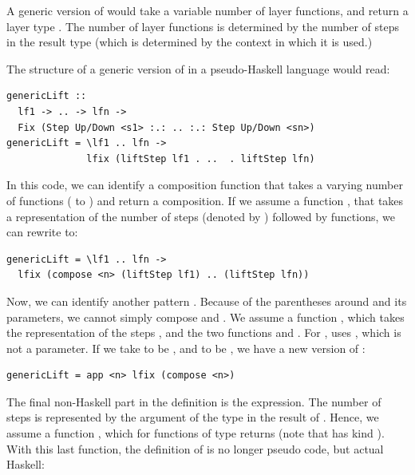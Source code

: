 \documentclass[preprint,natbib]{sigplanconf}
\begin{document}

A generic version of  would take a variable number of layer functions, and return a layer type . The number of layer functions is determined by the number of steps in the result type (which is determined by the context in which it is used.)

The structure of a generic version of  in a pseudo-Haskell language would read:

\begin{small}
\begin{verbatim}
genericLift :: 
  lf1 -> .. -> lfn ->
  Fix (Step Up/Down <s1> :.: .. :.: Step Up/Down <sn>)
genericLift = \lf1 .. lfn -> 
              lfix (liftStep lf1 . ..  . liftStep lfn)
\end{verbatim}%
\end{small}

In this code, we can identify a composition function that takes a varying number of functions ( to ) and return a composition. If we assume a function , that takes a representation of the number of steps (denoted by ) followed by  functions, we can rewrite  to:

\begin{small}
\begin{verbatim}
genericLift = \lf1 .. lfn -> 
  lfix (compose <n> (liftStep lf1) .. (liftStep lfn))
\end{verbatim}%
\end{small}

Now, we can identify another pattern . Because of the parentheses around  and its parameters, we cannot simply compose  and . We assume a function , which takes the representation of the steps , and the two functions  and . For ,  uses , which is not a parameter. If we take  to be , and  to be , we have a new version of :

\begin{small}
\begin{verbatim}
genericLift = app <n> lfix (compose <n>)
\end{verbatim}%
\end{small}

The final non-Haskell part in the definition is the  expression. The number of steps is represented by the argument of the  type in the result of . Hence, we assume a function , which for functions of type  returns  (note that  has kind \p{* -> *}). With this last function, the definition of  is no longer pseudo code, but actual Haskell:
\end{document}
